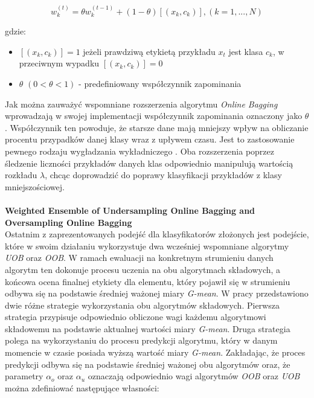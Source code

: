 \begin{equation}
    w^{(t)}_k = \theta w^{(t-1)}_k + (1 - \theta)[(x_k, c_k)], (k = 1, ..., N)
\end{equation}

\noindent gdzie:

\begin{itemize}
    \item $[(x_k, c_k)] = 1$ jeżeli prawdziwą etykietą przykładu $x_t$ jest klasa $c_k$, w przeciwnym wypadku $[(x_k, c_k)] = 0$
    \item $\theta$ $(0 < \theta < 1)$ - predefiniowany współczynnik zapominania
\end{itemize}

\noindent Jak można zauważyć wspomniane rozszerzenia algorytmu \textit{Online Bagging} wprowadzają w swojej implementacji współczynnik zapominania oznaczony jako $\theta$. Współczynnik ten powoduje, że starsze dane mają mniejszy wpływ na obliczanie procentu przypadków danej klasy wraz z upływem czasu. Jest to zastosowanie pewnego rodzaju wygładzania wykładniczego \cite{Article:OBSecond}. Oba rozszerzenia poprzez śledzenie liczności przykładów danych klas odpowiednio manipulują wartością rozkładu $\lambda$, chcąc doprowadzić do poprawy klasyfikacji przykładów z klasy mniejszościowej.\\\\
\textbf{Weighted Ensemble of Undersampling Online Bagging and Oversampling Online Bagging}\\

\noindent Ostatnim z zaprezentowanych podejść dla klasyfikatorów złożonych jest podejście, które w swoim działaniu wykorzystuje dwa wcześniej wspomniane algorytmy \textit{UOB} oraz \textit{OOB}. W ramach ewaluacji na konkretnym strumieniu danych algorytm ten dokonuje procesu uczenia na obu algorytmach składowych, a końcowa ocena finalnej etykiety dla elementu, który pojawił się w strumieniu odbywa się na podstawie średniej ważonej miary \textit{G-mean}. W pracy \cite{Article:OBSecond} przedstawiono dwie różne strategie wykorzystania obu algorytmów składowych. Pierwsza strategia przypisuje odpowiednio obliczone wagi każdemu algorytmowi składowemu na podstawie aktualnej wartości miary \textit{G-mean}. Druga strategia polega na wykorzystaniu do procesu predykcji algorytmu, który w danym momencie w czasie posiada wyższą wartość miary \textit{G-mean}. Zakładając, że proces predykcji odbywa się na podstawie średniej ważonej obu algorytmów oraz, że parametry $\alpha_o$ oraz $\alpha_u$ oznaczają odpowiednio wagi algorytmów \textit{OOB} oraz \textit{UOB} można zdefiniować następujące własności:

